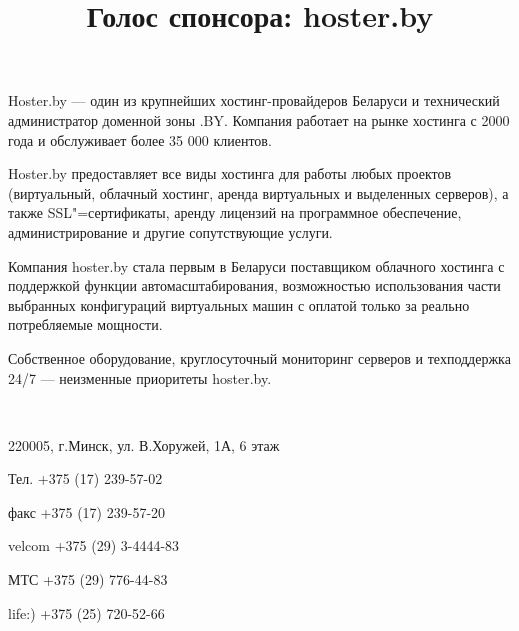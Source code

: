 \documentclass[10pt, a5paper]{article}
\begin{document}
\title{Голос спонсора: hoster.by}
\date{}
\maketitle%

Hoster.by --- один из крупнейших хостинг-провайдеров Беларуси и технический администратор доменной зоны .BY. Компания работает на рынке хостинга с 2000 года и обслуживает более 35 000 клиентов. 

Hoster.by предоставляет все виды хостинга для работы любых проектов (виртуальный, облачный хостинг, аренда виртуальных и выделенных серверов), а также SSL"=сертификаты, аренду лицензий на программное обеспечение, администрирование и другие сопутствующие услуги. 

Компания hoster.by стала первым в Беларуси поставщиком облачного хостинга с поддержкой функции автомасштабирования, возможностью использования части выбранных конфигураций виртуальных машин с оплатой только за реально потребляемые мощности.

Собственное оборудование, круглосуточный мониторинг серверов и техподдержка 24/7 --- неизменные приоритеты hoster.by.

~

\begin{flushright}
220005, г.Минск, ул. В.Хоружей, 1А, 6 этаж 

Тел. +375 (17) 239-57-02

факс +375 (17) 239-57-20

velcom +375 (29) 3-4444-83

МТС +375 (29) 776-44-83 

life:) +375 (25) 720-52-66
\end{flushright}
\end{document}
